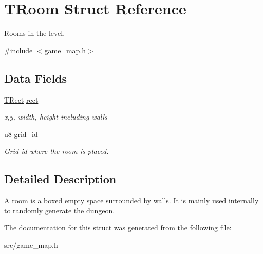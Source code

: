 \hypertarget{structTRoom}{}\section{T\+Room Struct Reference}
\label{structTRoom}


Rooms in the level.  




{\ttfamily \#include $<$game\+\_\+map.\+h$>$}

\subsection*{Data Fields}
\begin{DoxyCompactItemize}
\item 
\mbox{\hyperlink{structTRect}{T\+Rect}} \mbox{\hyperlink{group__GameMap_ga637db7778f278eaa8fd09ec009881ae2}{rect}}
\begin{DoxyCompactList}\small\item\em x,y, width, height including walls \end{DoxyCompactList}\item 
u8 \mbox{\hyperlink{group__GameMap_gaf547d9aae28ee0d3a09d51cb4650659c}{grid\+\_\+id}}
\begin{DoxyCompactList}\small\item\em Grid id where the room is placed. \end{DoxyCompactList}\end{DoxyCompactItemize}


\subsection{Detailed Description}
A room is a boxed empty space surrounded by walls. It is mainly used internally to randomly generate the dungeon. 

The documentation for this struct was generated from the following file\+:\begin{DoxyCompactItemize}
\item 
src/game\+\_\+map.\+h\end{DoxyCompactItemize}
